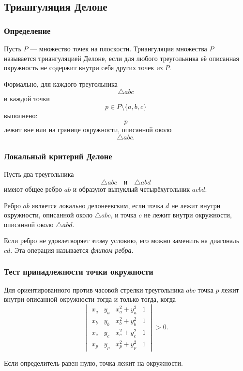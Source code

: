 \documentclass[12pt,a4paper]{article}
\begin{document}
\subsection{Триангуляция Делоне}

\subsubsection{Определение}

Пусть \(P\) — множество точек на плоскости. Триангуляция множества \(P\) называется триангуляцией Делоне, если для любого треугольника её описанная окружность не содержит внутри себя других точек из \(P\).

Формально, для каждого треугольника
\[
\triangle abc
\]
и каждой точки
\[
p\in P\setminus\{a,b,c\}
\]
выполнено:
\[
p
\]
лежит вне или на границе окружности, описанной около
\[
\triangle abc.
\]

\subsubsection{Локальный критерий Делоне}

Пусть два треугольника
\[
\triangle abc
\quad\text{и}\quad
\triangle abd
\]
имеют общее ребро \(ab\) и образуют выпуклый четырёхугольник \(acbd\).

Ребро \(ab\) является локально делонеевским, если точка \(d\) не лежит внутри окружности, описанной около \(\triangle abc\), и точка \(c\) не лежит внутри окружности, описанной около \(\triangle abd\).

Если ребро не удовлетворяет этому условию, его можно заменить на диагональ \(cd\). Эта операция называется \emph{флипом ребра}.

\subsubsection{Тест принадлежности точки окружности}

Для ориентированного против часовой стрелки треугольника \(abc\) точка \(p\) лежит внутри описанной окружности тогда и только тогда, когда
\[
\begin{vmatrix}
x_a & y_a & x_a^2+y_a^2 & 1\\
x_b & y_b & x_b^2+y_b^2 & 1\\
x_c & y_c & x_c^2+y_c^2 & 1\\
x_p & y_p & x_p^2+y_p^2 & 1
\end{vmatrix}
>0.
\]

Если определитель равен нулю, точка лежит на окружности.
\end{document}
